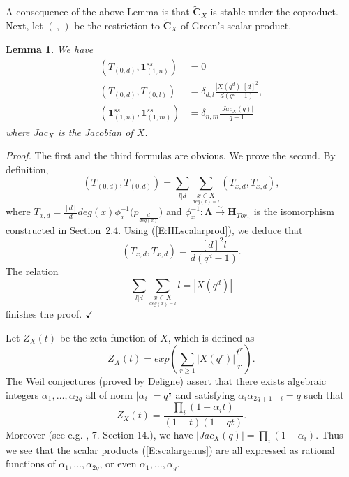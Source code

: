 \documentclass[a4paper,10pt]{amsart}
\def\H{\mathbf{H}}
\def\qed{$\hfill \checkmark$}
\def\a{\alpha}
\def\CC{\mathbf{C}}
\def\LLambda{\boldsymbol{\Lambda}}
\newtheorem{lem}[theo]{Lemma}
\numberwithin{equation}{section}
\begin{document}
{\vspace{.15in}

A consequence of the above Lemma is that $\widetilde{\CC}_{X}$ is stable under the coproduct.
Next, let $(\,,\,)$ be the restriction to $\widetilde{\CC}_X$ of Green's scalar product.

\vspace{.1in}

\begin{lem}\label{L:Greengenus} We have
\begin{equation}\label{E:scalargenus}
\begin{split}
({T}_{(0,d)},\mathbf{1}^{ss}_{(1,n)})&=0\\
({T}_{(0,d)},T_{(0,l)})&=\delta_{d,l} \frac{|X(q^d)|[d]^2}{d(q^d-1)},\\
(\mathbf{1}^{ss}_{(1,n)},\mathbf{1}^{ss}_{(1,m)})&=\delta_{n,m} \frac{|Jac_X(q)|}{q-1}
\end{split}
\end{equation}
where $Jac_X$ is the Jacobian of $X$.
\end{lem}
\noindent
\textit{Proof.} The first and the third formulas are obvious. We prove the second. By definition,
$$(T_{(0,d)},T_{(0,d)})=\sum_{l |d} \sum_{\underset{deg(x)=l}{x \in X}} (T_{x,d},T_{x,d}),$$
where $T_{x,d}=\frac{[d]}{d}deg(x) \phi_x^{-1}\big(p_{\frac{d}{deg(x)}}\big)$ and $\phi^{-1}_x: \LLambda
\stackrel{\sim}{\to} \H_{Tor_x}$ is the isomorphism constructed in Section~2.4.
Using (\ref{E:HLscalarprod}), we deduce that
$$(T_{x,d},T_{x,d})=\frac{[d]^2 l}{d(q^d-1)}.$$
The relation
$$\sum_{l|d} \sum_{\underset{deg(x)=l}{x \in X}} l=|X(q^d)|$$
finishes the proof. \qed

\vspace{.15in}

Let $Z_X(t)$ be the zeta function of $X$, which is defined as
$$Z_X(t)=exp\left(\sum_{ r \geq 1} |X(q^r)| \frac{t^r}{r}\right).$$
The Weil conjectures (proved by Deligne) assert that there exists algebraic integers $\a_1, \ldots, \a_{2g}$ all of norm $|\a_i|=q^{\frac{1}{2}}$ and satisfying $\a_i \a_{2g+1-i}=q$ such that
$$Z_X(t)=\frac{\prod_{i} (1-\a_it)}{(1-t)(1-qt)}.$$
Moreover (see e.g. \cite{Milne}, 7. Section 14.), we have $|Jac_X(q)|=\prod_i (1-\a_i)$. Thus we see that the scalar products (\ref{E:scalargenus}) are all expressed as rational functions of $\a_1, \ldots, \a_{2g}$, or even $\a_1, \ldots, \a_g$.

\vspace{.15in}

}
\end{document}
